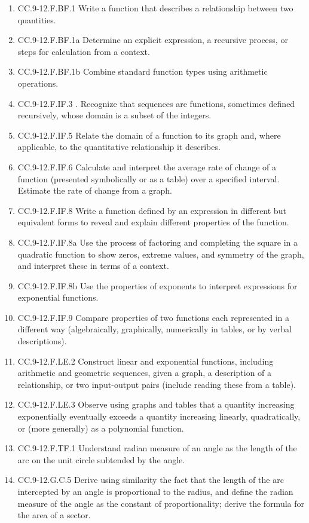 \documentclass{article}
\begin{document}
\begin{enumerate}
	\item CC.9-12.F.BF.1 Write a function that describes a relationship between two quantities.
	\item CC.9-12.F.BF.1a Determine an explicit expression, a recursive process, or steps for calculation from a context. 
	\item CC.9-12.F.BF.1b Combine standard function types using arithmetic operations. 
	\item CC.9-12.F.IF.3 . Recognize that sequences are functions, sometimes defined recursively, whose domain is a subset of the integers. 
	\item CC.9-12.F.IF.5  Relate the domain of a function to its graph and, where applicable, to the quantitative relationship it describes.
	\item CC.9-12.F.IF.6   Calculate and interpret the average rate of change of a function (presented symbolically or as a table) over a specified interval. Estimate the rate of change from a graph.
	\item CC.9-12.F.IF.8  Write a function defined by an expression in different but equivalent forms to reveal and explain different properties of the function. 
	\item CC.9-12.F.IF.8a Use the process of factoring and completing the square in a quadratic function to show zeros, extreme values, and symmetry of the graph, and interpret these in terms of a context. 
	\item CC.9-12.F.IF.8b Use the properties of exponents to interpret expressions for exponential functions. 
	\item CC.9-12.F.IF.9 Compare properties of two functions each represented in a different way (algebraically, graphically, numerically in tables, or by verbal descriptions).
	\item CC.9-12.F.LE.2  Construct linear and exponential functions, including arithmetic and geometric sequences, given a graph, a description of a relationship, or two input-output pairs (include reading these from a table).
	\item CC.9-12.F.LE.3  Observe using graphs and tables that a quantity increasing exponentially eventually exceeds a quantity increasing linearly, quadratically, or (more generally) as a polynomial function.
	\item CC.9-12.F.TF.1 Understand radian measure of an angle as the length of the arc on the unit circle subtended by the angle.
	\item CC.9-12.G.C.5  Derive using similarity the fact that the length of the arc intercepted by an angle is proportional to the radius, and define the radian measure of the angle as the constant of proportionality; derive the formula for the area of a sector.

\end{enumerate}
\end{document}
